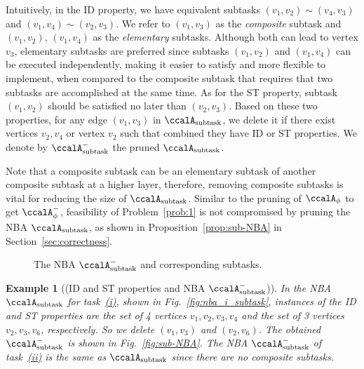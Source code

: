\documentclass[Afour,sageh,times]{sagej}
\newtheorem{exmp}{Example}
\newcommand{\auto}[1]{\ccalA_{\text{#1}}}
\newcommand{\autop}{\ccalA_{\phi}}
\newenvironment{cexmp}
{\addtocounter{exmp}{-1}\begin{exmp}}
  {\end{exmp}}
\begin{document}
Intuitively, in the ID property, we have equivalent subtasks $(v_1, v_2) \sim (v_4, v_3)$ and $(v_1, v_4) \sim (v_2, v_3)$. We refer to $(v_1, v_3)$ as the {\it composite} subtask and $(v_1, v_2)$, $(v_1, v_4)$ as the {\it elementary} subtasks.  Although both can lead to vertex $v_3$, elementary subtasks are preferred since subtasks $(v_1, v_2)$ and $(v_1, v_4)$ can be executed independently, making it easier to satisfy and more flexible to implement, when  compared to the composite subtask that requires that two subtasks are accomplished at the same time. As for the ST property, subtask $(v_1, v_2)$ should be satisfied no later than $(v_2, v_3)$. Based on these two properties, for any edge $(v_1, v_3)$ in $\auto{subtask}$, we delete it if there exist vertices $v_2, v_4$ or vertex $v_2$ such that combined they have ID or ST properties. We denote by $\auto{subtask}^-$ the pruned $\auto{subtask}$.

Note that a composite subtask can be an elementary subtask of another composite subtask at a higher layer, therefore, removing composite subtasks  is vital for reducing the size of $\auto{subtask}$. Similar to the pruning of $\autop$ to get $\autop^-$, feasibility of Problem~\ref{prob:1} is not compromised by pruning the NBA $\auto{subtask}$, as shown in Proposition~\ref{prop:sub-NBA} in Section~\ref{sec:correctness}. %
\begin{figure}[t]
    \centering
    \subfigure[$\auto{subtask}^-$]{
      \label{fig:sub-NBA}
      \texttt{[image: nba\_i\_subtask\_prune.pdf]}}
    \hspace{2em}
        \caption{The NBA $\auto{subtask}^-$ and corresponding subtasks.} \label{fig:subtask_prune}
  \end{figure}
\begin{cexmp} [(ID and ST properties and NBA $\auto{subtask}^-$)]
  In the NBA $\auto{subtask}$ for task~\hyperref[task:i]{\it (i)}, shown in Fig.~\ref{fig:nba_i_subtask}, instances of the ID and ST properties are the set of 4 vertices $v_1, v_2, v_3, v_4$ and the set of 3 vertices $v_2, v_3, v_6$, respectively. So we delete $(v_1, v_3)$ and $(v_2, v_6)$. The obtained $\auto{subtask}^-$ is shown in Fig.~\ref{fig:sub-NBA}. The NBA $\auto{subtask}^-$ of task~\hyperref[task:ii]{\it (ii)} is the same as $\auto{subtask}$ since there are no composite subtasks.
\end{cexmp}
\end{document}
